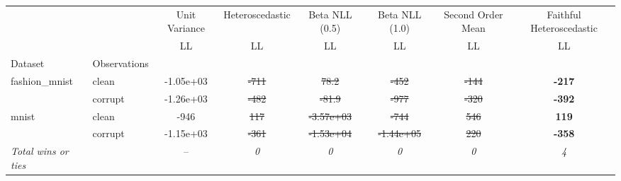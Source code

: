 \begin{tabular}{ll|c|c|c|c|c|c}
\toprule
{} & {} & {Unit Variance} & {Heteroscedastic} & {Beta NLL (0.5)} & {Beta NLL (1.0)} & {Second Order Mean} & {Faithful Heteroscedastic} \\
{} & {} & {LL} & {LL} & {LL} & {LL} & {LL} & {LL} \\
{Dataset} & {Observations} & {} & {} & {} & {} & {} & {} \\
\midrule
\multirow[t]{2}{*}{fashion_mnist} & clean & -1.05e+03 & \sout{-711} & \sout{78.2} & \sout{-452} & \sout{-144} & \textbf{-217} \\
 & corrupt & -1.26e+03 & \sout{-482} & \sout{-81.9} & \sout{-977} & \sout{-320} & \textbf{-392} \\
\multirow[t]{2}{*}{mnist} & clean & -946 & \sout{117} & \sout{-3.57e+03} & \sout{-744} & \sout{546} & \textbf{119} \\
 & corrupt & -1.15e+03 & \sout{-361} & \sout{-1.53e+04} & \sout{-1.44e+05} & \sout{220} & \textbf{-358} \\
\textit{{Total wins or ties}} &  & -- & \textit{0} & \textit{0} & \textit{0} & \textit{0} & \textit{4} \\
\bottomrule
\end{tabular}
